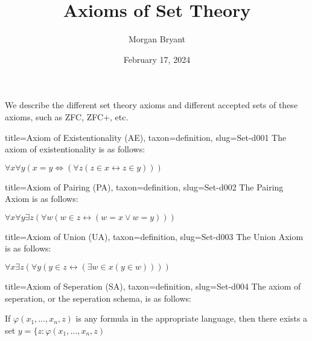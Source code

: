 \documentclass[a4paper]{article}
\title{Axioms of Set Theory}
\date{February 17, 2024}
\author{Morgan Bryant}
\begin{document}
\maketitle
\par{We describe the different set theory axioms and different accepted sets of these axioms, such as ZFC, ZFC+, etc.}
\begin{tree}{title={Axiom of Existentionality (AE)}, taxon={definition}, slug={Set-d001}}
The axiom of existentionality is as follows:\par{\(\forall  x  \forall  y( x = y  \Leftrightarrow  ( \forall  z (z \in  x  \leftrightarrow  z \in  y)))\)}
\end{tree}

\begin{tree}{title={Axiom of Pairing (PA)}, taxon={definition}, slug={Set-d002}}
The Pairing Axiom is as follows:\par{\(\forall  x  \forall  y  \exists  z ( \forall  w(w \in  z  \leftrightarrow  (w= x \lor  w=y)))\)}
\end{tree}

\begin{tree}{title={Axiom of Union (UA)}, taxon={definition}, slug={Set-d003}}
The Union Axiom is as follows:\par{\(\forall  x  \exists  z( \forall  y( y \in  z  \leftrightarrow  ( \exists  w  \in  x (y \in  w))))\)}
\end{tree}

\begin{tree}{title={Axiom of Seperation (SA)}, taxon={definition}, slug={Set-d004}}
The axiom of seperation, or the seperation schema, is as follows:\par{If \(\varphi (x_1, \dots , x_n,z)\) is any formula in the appropriate language, then there exists a set \( y =  \{ z:  \varphi (x_1, \dots , x_n, z)\)}
\end{tree}

\printbibliography
\end{document}
